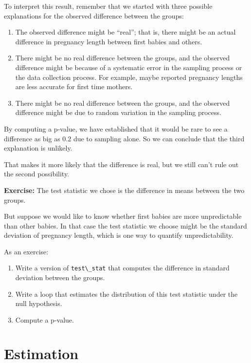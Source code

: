 To interpret this result, remember that we started with three possible
explanations for the observed difference between the groups:

\begin{enumerate}
\def\labelenumi{\arabic{enumi}.}
\item
  The observed difference might be ``real''; that is, there might be an
  actual difference in pregnancy length between first babies and others.
\item
  There might be no real difference between the groups, and the observed
  difference might be because of a systematic error in the sampling
  process or the data collection process. For example, maybe reported
  pregnancy lengths are less accurate for first time mothers.
\item
  There might be no real difference between the groups, and the observed
  difference might be due to random variation in the sampling process.
\end{enumerate}

By computing a p-value, we have established that it would be rare to see
a difference as big as 0.2 due to sampling alone. So we can conclude
that the third explanation is unlikely.

That makes it more likely that the difference is real, but we still
can't rule out the second possibility.

\textbf{Exercise:} The test statistic we chose is the difference in
means between the two groups.

But suppose we would like to know whether first babies are more
unpredictable than other babies. In that case the test statistic we
choose might be the standard deviation of pregnancy length, which is one
way to quantify unpredictability.

As an exercise:

\begin{enumerate}
\def\labelenumi{\arabic{enumi}.}
\item
  Write a version of \passthrough{\lstinline!test\_stat!} that computes
  the difference in standard deviation between the groups.
\item
  Write a loop that estimates the distribution of this test statistic
  under the null hypothesis.
\item
  Compute a p-value.
\end{enumerate}

\hypertarget{estimation}{%
\section{Estimation}\label{estimation}}


